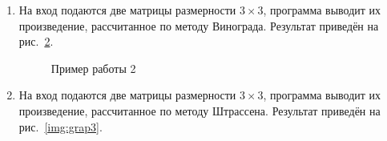 \documentclass[12pt, a4paper]{article}
\begin{document}
\begin{enumerate}
\begin{figure}[h]
  		\label{img:grap1}
	\end{figure}
	\item На вход подаются две матрицы размерности $3 \times 3$, 
	программа выводит их произведение, рассчитанное по методу Винограда.
	Результат приведён на рис.~\ref{img:grap2}.
	\begin{figure}[h]
  		\caption{Пример работы 2}
  		\label{img:grap2}
	\end{figure}
	\newpage
	\item На вход подаются две матрицы размерности $3 \times 3$, 
	программа выводит их произведение, рассчитанное по методу Штрассена.
	Результат приведён на рис.~\ref{img:grap3}.	
	\begin{figure}[h]

\end{figure}
\end{enumerate}
\end{document}
